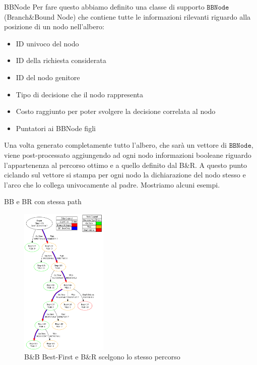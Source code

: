\documentclass[10pt]{beamer}
\begin{document}
    \begin{frame}{BBNode}
        Per fare questo abbiamo definito una classe di supporto $\texttt{BBNode}$ (Branch\&Bound Node) che contiene tutte le informazioni rilevanti riguardo alla posizione di un nodo nell'albero: 
        \begin{itemize}
            \item ID univoco del nodo
            \item ID della richiesta considerata
            \item ID del nodo genitore
            \item Tipo di decisione che il nodo rappresenta
            \item Costo raggiunto per poter svolgere la decisione correlata al nodo
            \item Puntatori ai BBNode figli
        \end{itemize}
        Una volta generato completamente tutto l'albero, che sarà un vettore di $\texttt{BBNode}$, viene post-processato aggiungendo ad ogni nodo informazioni booleane riguardo l'appartenenza al percorso ottimo e a quello definito dal B\&R. A questo punto ciclando sul vettore si stampa per ogni nodo la dichiarazione del nodo stesso e l'arco che lo collega univocamente al padre. Mostriamo alcuni esempi.
    \end{frame}

    \begin{frame}{BB e BR con stessa path}
            \begin{figure}[!h]
                \centering
                \includegraphics[width=0.37\textwidth]{Images/same_path.png}
                \caption{B\&B Best-First e B\&R scelgono lo stesso percorso}
            \label{fig:BBBFuguale}
            \end{figure}
    \end{frame}
\end{document}
